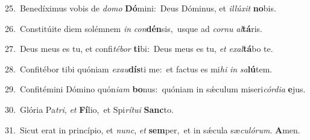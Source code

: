 {\numbfont\textcolor{\numbcolor}{25.}}~Benedíximus vobis de \textit{do}\-\textit{mo} \textbf{Dó}\-mini:~\star Deus Dóminus, et \textit{il}\-\textit{lú}\textit{xit} \textbf{no}\-bis.\par
{\numbfont\textcolor{\numbcolor}{26.}}~Constitúite diem solémnem \textit{in} \textit{con}\-\textbf{dén}sis,~\star usque ad \textit{cor}\-\textit{nu} \textit{al}\-\textbf{tá}ris.\par
{\numbfont\textcolor{\numbcolor}{27.}}~Deus meus es tu, et confi\-\textit{té}\-\textit{bor} \textbf{ti}\-bi:~\star Deus meus es tu, \textit{et} \textit{ex}\-\textit{al}\textbf{tá}bo te.\par
{\numbfont\textcolor{\numbcolor}{28.}}~Confitébor tibi quóniam \textit{ex}\-\textit{au}\textbf{dís}ti me:~\star et factus es mi\textit{hi} \textit{in} \textit{sa}\-\textbf{lú}tem.\par
{\numbfont\textcolor{\numbcolor}{29.}}~Confitémini Dómino quón\-\textit{i}\-\textit{am} \textbf{bo}\-nus:~\star quóniam in sǽculum miseri\-\textit{cór}\-\textit{di}\textit{a} \textbf{e}\-jus.\par
{\numbfont\textcolor{\numbcolor}{30.}}~Glória Pa\-\textit{tri}\-, \textit{et} \textbf{Fí}\-lio,~\star et Spi\-\textit{rí}\-\textit{tu}\textit{i} \textbf{Sanc}\-to.\par
{\numbfont\textcolor{\numbcolor}{31.}}~Sicut erat in princípio, et \textit{nunc}\-, \textit{et} \textbf{sem}\-per,~\star et in sǽcula sæ\-\textit{cu}\-\textit{ló}\textit{rum}. \textbf{A}\-men.\par
